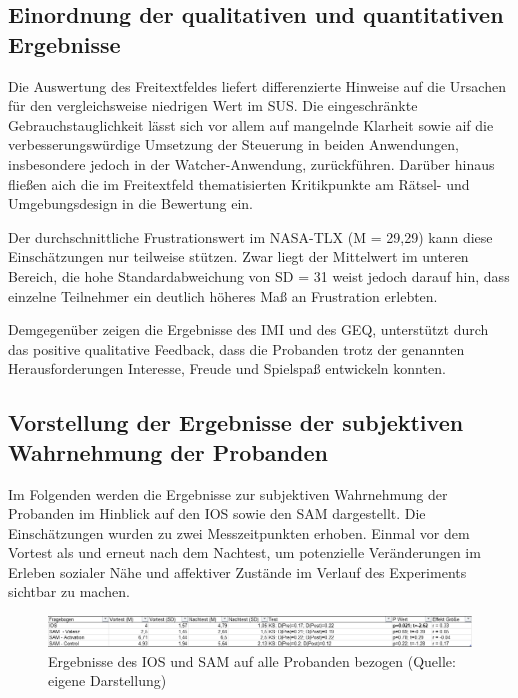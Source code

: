 \subsection{Einordnung der qualitativen und quantitativen Ergebnisse}

Die Auswertung des Freitextfeldes liefert differenzierte Hinweise auf die Ursachen für den vergleichsweise niedrigen Wert im \ac{SUS}. Die eingeschränkte Gebrauchstauglichkeit lässt sich vor allem auf mangelnde Klarheit sowie aif die verbesserungswürdige Umsetzung der Steuerung in beiden Anwendungen, insbesondere jedoch in der Watcher-Anwendung, zurückführen. Darüber hinaus fließen aich die im Freitextfeld thematisierten Kritikpunkte am Rätsel- und Umgebungsdesign in die Bewertung ein.

Der durchschnittliche Frustrationswert im \ac{NASA-TLX} (M = 29,29) kann diese Einschätzungen nur teilweise stützen. Zwar liegt der Mittelwert im unteren Bereich, die hohe Standardabweichung von SD = 31 weist jedoch darauf hin, dass einzelne Teilnehmer ein deutlich höheres Maß an Frustration erlebten.

Demgegenüber zeigen die Ergebnisse des \ac{IMI} und des \ac{GEQ}, unterstützt durch das positive qualitative Feedback, dass die Probanden trotz der genannten Herausforderungen Interesse, Freude und Spielspaß entwickeln konnten.

\subsection{Vorstellung der Ergebnisse der subjektiven Wahrnehmung der Probanden}

Im Folgenden werden die Ergebnisse zur subjektiven Wahrnehmung der Probanden im Hinblick auf den \ac{IOS} sowie den \ac{SAM} dargestellt. Die Einschätzungen wurden zu zwei Messzeitpunkten erhoben. Einmal vor dem Vortest als  und erneut nach dem Nachtest, um potenzielle Veränderungen im Erleben sozialer Nähe und affektiver Zustände im Verlauf des Experiments sichtbar zu machen.

\begin{figure}[ht]
\centering
\includegraphics[width=1\linewidth]{content/pictures/IOS_SAM_Overal.png}
\caption{Ergebnisse des \ac{IOS} und \ac{SAM} auf alle Probanden bezogen (Quelle: eigene Darstellung)}
\label{fig:ios_sam_overal}
\end{figure}

